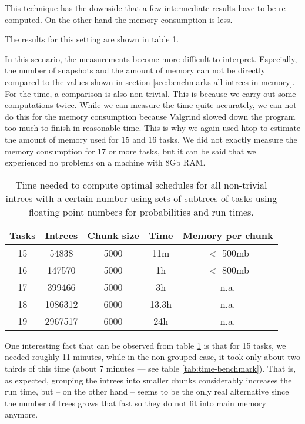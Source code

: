 This technique has the downside that a few intermediate results have to be re-computed. On the other hand the memory consumption is less.

The results for this setting are shown in table \ref{tab:benchmark-clustered-run-time}.

In this scenario, the measurements become more difficult to interpret. Especially, the number of snapshots and the amount of memory can not be directly compared to the values shown in section \ref{sec:benchmarks-all-intrees-in-memory}. For the time, a comparison is also non-trivial. This is because we carry out some computations twice. While we can measure the time quite accurately, we can not do this for the memory consumption because Valgrind slowed down the program too much to finish in reasonable time. This is why we again used htop to estimate the amount of memory used for 15 and 16 tasks. We did not exactly measure the memory consumption for 17 or more tasks, but it can be said that we experienced no problems on a machine with 8Gb RAM.

\begin{table}[ht]
  \centering
  \begin{tabular}[ht]{ccccc}
    Tasks & Intrees & Chunk size & Time & Memory per chunk \\
    \hline
    15 & 54838 & 5000 & 11m & $<$ 500mb \\
    16 & 147570 & 5000 & 1h & $<$ 800mb \\
    17 & 399466 & 5000 & 3h & n.a. \\
    18 & 1086312 & 6000 & 13.3h & n.a. \\
    19 & 2967517 & 6000 & 24h & n.a.
  \end{tabular}
  \caption{Time needed to compute optimal schedules for all non-trivial intrees  with a certain number using sets of subtrees of tasks using floating point numbers for probabilities and run times.}
  \label{tab:benchmark-clustered-run-time}
\end{table}

One interesting fact that can be observed from table \ref{tab:benchmark-clustered-run-time} is that for 15 tasks, we needed roughly 11 minutes, while in the non-grouped case, it took only about two thirds of this time (about 7 minutes --- see table \ref{tab:time-benchmark}). That is, as expected, grouping the intrees into smaller chunks considerably increases the run time, but -- on the other hand -- seems to be the only real alternative since the number of trees grows that fast so they do not fit into main memory anymore.

